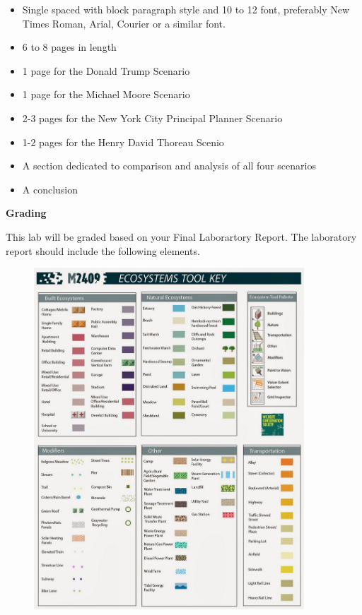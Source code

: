 \documentclass{article}
\begin{document}
\begin{itemize}

\item Single spaced with block paragraph style and 10 to 12 font, preferably New Times Roman, Arial, Courier or a similar font.
\item 6 to 8 pages in length
\item 1 page for the Donald Trump Scenario
\item 1 page for the Michael Moore Scenario
\item 2-3 pages for the New York City Principal Planner Scenario
\item 1-2 pages for the Henry David Thoreau Scenio
\item A section dedicated to comparison and analysis of all four scenarios
\item A conclusion

\end{itemize}


\setlength{\leftskip}{0cm}

\textbf{Grading}

\vspace{4mm}

\setlength{\leftskip}{1cm}

\setlength{\parindent}{0cm}

This lab will be graded based on your Final Laborartory Report.  The laboratory report should include the following elements.

\newpage

\begin{center}
\begin{figure}[t!]
\includegraphics[width=0.9\textwidth]{key.png}
\end{figure}
\end{center}

\end{document}

